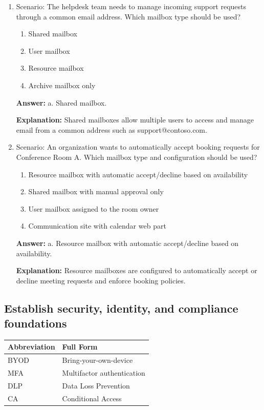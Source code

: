 \documentclass[10pt]{article}
\begin{document}
\begin{enumerate}[leftmargin=*]
\item Scenario: The helpdesk team needs to manage incoming support requests through a common email address. Which mailbox type should be used?
\begin{enumerate}[label=\alph*., leftmargin=1.5em]
\item Shared mailbox
\item User mailbox
\item Resource mailbox
\item Archive mailbox only
\end{enumerate}
\textbf{Answer:} a. Shared mailbox.

\textbf{Explanation:} Shared mailboxes allow multiple users to access and manage email from a common address such as support@contoso.com.

\item Scenario: An organization wants to automatically accept booking requests for Conference Room A. Which mailbox type and configuration should be used?
\begin{enumerate}[label=\alph*., leftmargin=1.5em]
\item Resource mailbox with automatic accept/decline based on availability
\item Shared mailbox with manual approval only
\item User mailbox assigned to the room owner
\item Communication site with calendar web part
\end{enumerate}
\textbf{Answer:} a. Resource mailbox with automatic accept/decline based on availability.

\textbf{Explanation:} Resource mailboxes are configured to automatically accept or decline meeting requests and enforce booking policies.

\end{enumerate}
\clearpage

\subsection{Establish security, identity, and compliance foundations}

\begin{center}
\begin{tabular}{>{\raggedright\arraybackslash}p{} >{\raggedright\arraybackslash}p{}}
\toprule
\textbf{Abbreviation} & \textbf{Full Form} \\
\midrule
BYOD & Bring-your-own-device \\
MFA & Multifactor authentication \\
DLP & Data Loss Prevention \\
CA & Conditional Access \\
\end{tabular}
\end{center}
\end{document}
